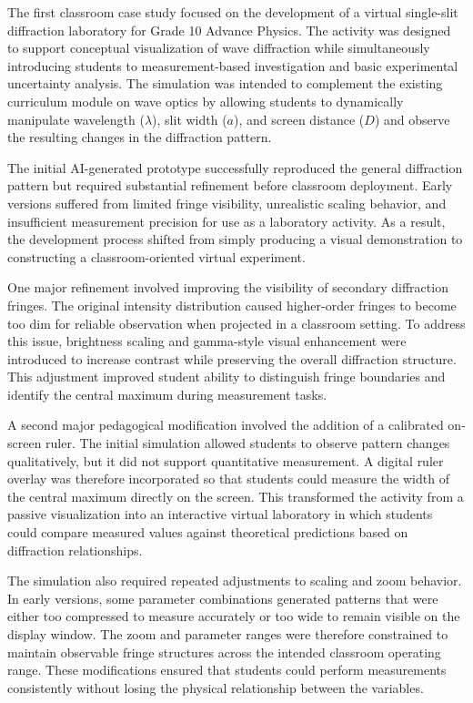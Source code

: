 \documentclass{iopjournal}
\begin{document}
The first classroom case study focused on the development of a virtual single-slit diffraction laboratory for Grade 10 Advance Physics. The activity was designed to support conceptual visualization of wave diffraction while simultaneously introducing students to measurement-based investigation and basic experimental uncertainty analysis. The simulation was intended to complement the existing curriculum module on wave optics by allowing students to dynamically manipulate wavelength ($\lambda$), slit width ($a$), and screen distance ($D$) and observe the resulting changes in the diffraction pattern.

The initial AI-generated prototype successfully reproduced the general diffraction pattern but required substantial refinement before classroom deployment. Early versions suffered from limited fringe visibility, unrealistic scaling behavior, and insufficient measurement precision for use as a laboratory activity. As a result, the development process shifted from simply producing a visual demonstration to constructing a classroom-oriented virtual experiment.

One major refinement involved improving the visibility of secondary diffraction fringes. The original intensity distribution caused higher-order fringes to become too dim for reliable observation when projected in a classroom setting. To address this issue, brightness scaling and gamma-style visual enhancement were introduced to increase contrast while preserving the overall diffraction structure. This adjustment improved student ability to distinguish fringe boundaries and identify the central maximum during measurement tasks.

A second major pedagogical modification involved the addition of a calibrated on-screen ruler. The initial simulation allowed students to observe pattern changes qualitatively, but it did not support quantitative measurement. A digital ruler overlay was therefore incorporated so that students could measure the width of the central maximum directly on the screen. This transformed the activity from a passive visualization into an interactive virtual laboratory in which students could compare measured values against theoretical predictions based on diffraction relationships.

The simulation also required repeated adjustments to scaling and zoom behavior. In early versions, some parameter combinations generated patterns that were either too compressed to measure accurately or too wide to remain visible on the display window. The zoom and parameter ranges were therefore constrained to maintain observable fringe structures across the intended classroom operating range. These modifications ensured that students could perform measurements consistently without losing the physical relationship between the variables.
\end{document}
